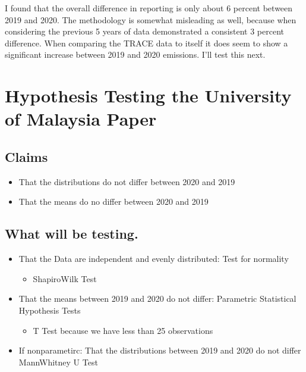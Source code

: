 \documentclass[letterpaper,10pt,english]{jupyterBook}
\begin{document}
\sphinxAtStartPar
I found that the overall difference in reporting is only about 6 percent between 2019 and 2020.   The methodology is somewhat misleading as well, because when considering the previous 5 years of data demonstrated a consistent 3 percent difference.  When comparing the TRACE data to itself it does seem to show a significant increase between 2019 and 2020 emissions. I’ll test this next.

\sphinxstepscope


\chapter{Hypothesis Testing the University of Malaysia Paper}
\label{\detokenize{notebooks/testing_malaysian_paper:hypothesis-testing-the-university-of-malaysia-paper}}\label{\detokenize{notebooks/testing_malaysian_paper::doc}}

\section{Claims}
\label{\detokenize{notebooks/testing_malaysian_paper:claims}}\begin{itemize}
\item {} 
\sphinxAtStartPar
That the distributions do not differ between 2020 and 2019

\item {} 
\sphinxAtStartPar
That the means do no differ between 2020 and 2019

\end{itemize}


\section{What will be testing.}
\label{\detokenize{notebooks/testing_malaysian_paper:what-will-be-testing}}\begin{itemize}
\item {} 
\sphinxAtStartPar
That the Data are independent and evenly distributed: Test for normality
\begin{itemize}
\item {} 
\sphinxAtStartPar
Shapiro\sphinxhyphen{}Wilk Test

\end{itemize}

\item {} 
\sphinxAtStartPar
That the means between 2019 and 2020 do not differ: Parametric Statistical Hypothesis Tests
\begin{itemize}
\item {} 
\sphinxAtStartPar
T Test because we have less than 25 observations

\end{itemize}

\item {} 
\sphinxAtStartPar
If nonparametirc: That the distributions between 2019 and 2020 do not differ
Mann\sphinxhyphen{}Whitney U Test

\end{itemize}
\end{document}
